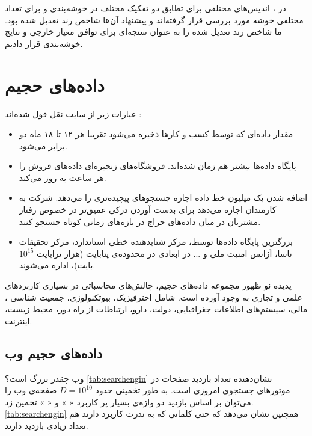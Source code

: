 در 
\cite{ari1986}%
، اندیس‌های مختلفی برای تطابق دو تفکیک مختلف در خوشه‌بندی و برای تعداد مختلفی خوشه مورد بررسی قرار گرفته‌اند و پیشنهاد آن‌ها شاخص رند تعدیل شده بود. ما شاخص رند تعدیل شده را به عنوان سنجه‌ای برای توافق معیار خارجی و نتایج خوشه‌بندی قرار دادیم.
\cite{yeung2001details}
\bigskip

\section{داده‌های حجیم}
عبارات زیر از سایت 
نقل قول شده‌اند
\cite{site_iw}
:

\begin{itemize}
\item
مقدار داده‌ای که توسط کسب و کارها ذخیره می‌شود تقریبا هر ۱۲ تا ۱۸ ماه دو برابر می‌شود.
\item
پایگاه داده‌ها بیشتر هم ‌زمان شده‌اند. فروشگاه‌های زنجیره‌ای 
داده‌های فروش را هر ساعت به روز می‌کند.
\item
اضافه شدن یک میلیون خط داده اجازه جستجوهای پیچیده‌تری را می‌دهد. شرکت 
به کارمندان اجازه می‌دهد برای بدست آوردن درکی عمیق‌تر در خصوص رفتار مشتریان در میان داده‌های حراج در بازه‌های زمانی کوتاه جستجو کنند.
\item
بزرگترین پایگاه داده‌ها توسط، مرکز شتابدهنده خطی استاندارد، مرکز تحقیقات ناسا، آژانس امنیت ملی و ... در ابعادی در محدوده‌ی پتابایت (هزار ترابایت 
$10^{15}$
بایت)، اداره می‌شوند.
\end{itemize}

پدیده نو ظهور مجموعه‌ داده‌های حجیم، چالش‌های محاسباتی در بسیاری کاربردهای علمی و تجاری به وجود آورده است. شامل اخترفیزیک، بیوتکنولوزی، جمعیت شناسی%
، مالی، سیستم‌های اطلاعات جغرافیایی، دولت، دارو، ارتباطات از راه دور، محیط زیست، اینترنت.

\subsection{داده‌های حجیم وب}

وب چقدر بزرگ است؟  
\autoref{tab:searchengin}
نشان‌دهنده تعداد بازدید صفحات در موتورهای جستجوی امروزی است. به طور تخمینی حدود 
$D = 10^{10}$
صفحه‌ی وب را می‌توان بر اساس بازدید دو واژه‌ی بسیار پر کاربرد «
» و «
» تخمین زد. 
\autoref{tab:searchengin}
 همچنین نشان می‌دهد که حتی کلماتی که به ندرت کاربرد دارند هم تعداد زیادی بازدید دارند.

